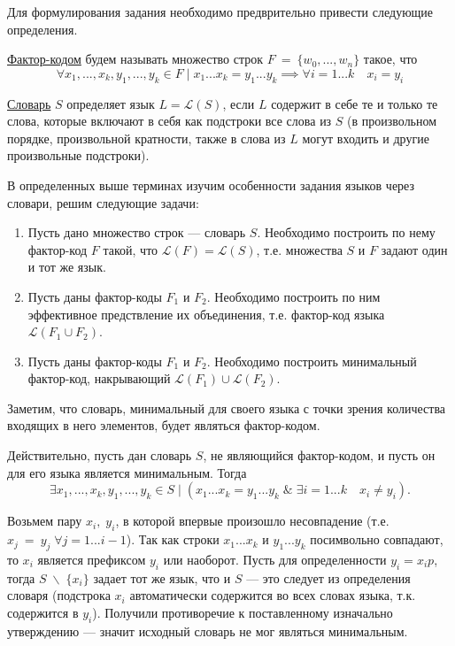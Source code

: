 \documentclass[14pt, russian]{scrartcl}
\newcommand{\Lang}{\ensuremath{\mathcal{L}}}
\begin{document}
Для формулирования задания необходимо предврительно привести следующие определения.

\begin{Definition}
\label{f-c}
\underline{Фактор-кодом} будем называть множество строк $F~=~\{w_0, ..., w_n\}$ такое, 
что $$ \forall x_1, ..., x_k, y_1, ..., y_k \in F\; | \; x_1...x_k = y_1...y_k \implies \forall i = 1...k \quad x_i = y_i  $$ 
\end{Definition}

\begin{Definition}
\label{Dict}
    \underline{Словарь} $S$ определяет язык $L = \Lang(S)$, если $L$ содержит в себе те и только те слова, которые включают в себя как подстроки все слова из $S$ (в произвольном порядке, произвольной кратности, также в слова из $L$ могут входить и другие произвольные подстроки). 
\end{Definition}

В определенных выше терминах изучим особенности задания языков через словари, решим следующие задачи:

\begin{enumerate}
    \item Пусть дано множество строк --- словарь $S$. Необходимо построить по нему фактор-код $F$ такой, что $\Lang(F) = \Lang(S)$, т.е. множества $S$ и $F$ задают один и тот же язык. 
    \item Пусть даны фактор-коды $F_1$ и $F_2$. Необходимо построить по ним эффективное предствление их объединения, т.е. фактор-код языка $\Lang(F_1 \cup F_2 )$.
    \item Пусть даны фактор-коды $F_1$ и $F_2$. Необходимо построить минимальный фактор-код, накрывающий $\Lang(F_1) \cup \Lang(F_2)$. 
\end{enumerate}

Заметим, что словарь, минимальный для своего языка с точки зрения количества входящих в него элементов, будет являться фактор-кодом.

 Действительно, пусть дан словарь $S$, не являющийся фактор-кодом, и пусть он для его языка является минимальным. Тогда 
$$ \exists x_1, ..., x_k, y_1, ..., y_k \in S \; |\; (x_1...x_k = y_1...y_k \; \& \; \exists i = 1...k \quad x_i \neq y_i). $$

Возьмем пару $x_i, \; y_i$, в которой впервые произошло несовпадение (т.е. $x_j~=~y_j \; \forall j = 1...i-1$). Так как строки $x_1...x_k$ и $y_1...y_k$ посимвольно совпадают, то $x_i$ является префиксом $y_i$ или наоборот. Пусть для определенности $y_i = x_i p$, тогда $S \; \backslash \; \{x_i\}$ задает тот же язык, что и $S$ --- это следует из определения словаря (подстрока $x_i$ автоматически содержится во всех словах языка, т.к. содержится в $y_i$). Получили противоречие к поставленному изначально утверждению --- значит исходный словарь не мог являться минимальным.
\end{document}
